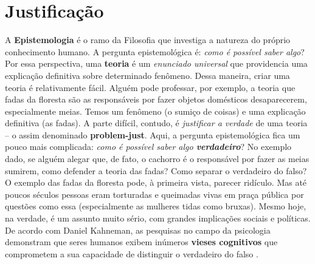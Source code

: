 \documentclass[./main.tex]{subfiles}
\begin{document}
\section{Justificação} \label{sec:epis:justific}

\par A \textbf{Epistemologia} é o ramo da Filosofia que investiga a natureza do próprio conhecimento humano. A pergunta epistemológica é: \textit{como é possível saber algo}? Por essa perspectiva, uma \textbf{\gls{teoria}} é um \textit{enunciado universal} que providencia uma explicação definitiva sobre determinado fenômeno. Dessa maneira, criar uma \gls{teoria} é relativamente fácil. Alguém pode professar, por exemplo, a \gls{teoria} que fadas da floresta são as responsáveis por fazer objetos domésticos desaparecerem, especialmente meias. Temos um fenômeno (o sumiço de coisas) e uma explicação definitiva (as fadas). A parte difícil, contudo, é \textit{justificar a verdade} de uma \gls{teoria} -- o assim denominado \textbf{\gls{problem-just}}. Aqui, a pergunta epistemológica fica um pouco mais complicada: \textit{como é possível saber algo \textbf{verdadeiro}}? No exemplo dado, se alguém alegar que, de fato, o cachorro é o responsável por fazer as meias sumirem, como defender a \gls{teoria} das fadas? Como separar o verdadeiro do falso? O exemplo das fadas da floresta pode, à primeira vista, parecer ridículo. Mas até poucos séculos pessoas eram torturadas e queimadas vivas em praça pública por questões como essa (especialmente as mulheres tidas como bruxas). Mesmo hoje, na verdade, é um assunto muito sério, com grandes implicações sociais e políticas. De acordo com Daniel Kahneman, as pesquisas no campo da psicologia demonstram que seres humanos exibem inúmeros \textbf{vieses cognitivos} que comprometem a sua capacidade de distinguir o verdadeiro do falso \cite{kahneman2011}.  
\end{document}
